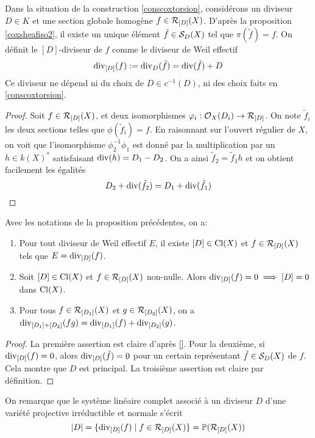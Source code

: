 \begin{cons}\label{conscoxtorsion}
Dans la situation de la construction \ref{conscoxtorsion}, considérons un diviseur $D\in K$ et une section globale homogène $f\in\mathcal{R}_{[D]}(X)$. D'après la proposition \ref{coxsheafiso2}, il existe un unique élément $\tilde{f}\in\mathcal{S}_D(X)$ tel que $\pi(\tilde{f})=f$. On définit le $[D]$-diviseur de $f$ comme le diviseur de Weil effectif
$$\operatorname{div}_{[D]}(f):=\operatorname{div}_D(\tilde{f})=\operatorname{div}(\tilde{f})+D$$
Ce diviseur ne dépend ni du choix de $D\in c^{-1}(D)$, ni des choix faits en \ref{conscoxtorsion}.
\end{cons}
\begin{proof}
Soit $f\in\mathcal{R}_{[D]}(X)$, et deux isomorphismes $\varphi_i:\mathcal{O}_X(D_i)\rightarrow \mathcal{R}_{[D]}$. On note $\tilde{f}_i$ les deux sections telles que $\phi(\tilde{f}_i)=f$. En raisonnant sur l'ouvert régulier de $X$, on voit que l'isomorphisme $\phi_2^{-1}\phi_1$ est donné par la multiplication par un $h\in k(X)^*$ satisfaisant $\operatorname{div}(h)=D_1-D_2$. On a ainsi $\tilde{f}_2=\tilde{f}_1h$ et on obtient facilement les égalités
$$D_2+\operatorname{div}(\tilde{f}_2)=D_1+\operatorname{div}(\tilde{f}_1)$$
\end{proof}


\begin{prop}\label{diviCoxTorsFormulas}
Avec les notations de la proposition précédentes, on a:
\begin{enumerate}
\item Pour tout diviseur de Weil effectif $E$, il existe $[D]\in\operatorname{Cl}(X)$ et $f\in\mathcal{R}_{[D]}(X)$ tels que $E=\operatorname{div}_{[D]}(f)$.
\item Soit $[D]\in\operatorname{Cl}(X)$ et $f\in\mathcal{R}_{[D]}(X)$ non-nulle. Alors $\operatorname{div}_{[D]}(f)=0\implies [D]=0$ dans $\operatorname{Cl}(X)$.
\item Pour tous $f\in\mathcal{R}_{[D_1]}(X)$ et $g\in\mathcal{R}_{[D_2]}(X)$, on a $\operatorname{div}_{[D_1]+[D_2]}(fg)=\operatorname{div}_{[D_1]}(f)+\operatorname{div}_{[D_2]}(g)$.
\end{enumerate}
\end{prop}
\begin{proof}
La première assertion est claire d'après \ref{}. Pour la deuxième, si $\operatorname{div}_{[D]}(f)=0$, alors $\operatorname{div}_{[D]}(\tilde{f})=0$ pour un certain représentant $\tilde{f}\in\mathcal{S}_D(X)$ de $f$. Cela montre que $D$ est principal. La troisième assertion est claire par définition.
\end{proof}

On remarque que le système linéaire complet associé à un diviseur $D$ d'une variété projective irréductible et normale s'écrit
$$|D|=\lbrace\operatorname{div}_{[D]}(f)\mid f\in \mathcal{R}_{[D]}(X)\rbrace = \mathbb{P}(\mathcal{R}_{[D]}(X))$$

